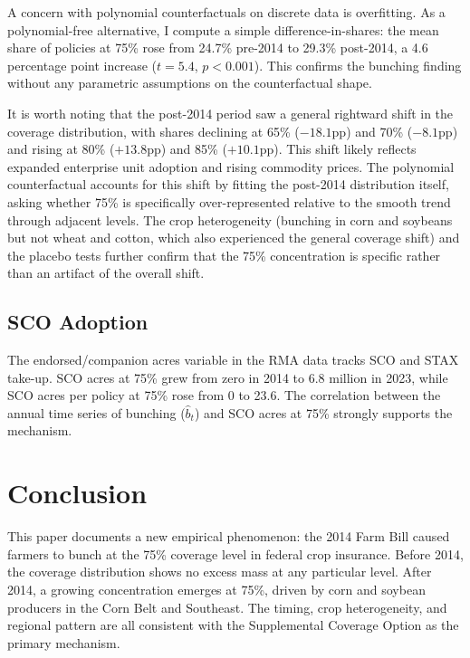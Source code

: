 \documentclass[12pt]{article}
\begin{document}
A concern with polynomial counterfactuals on discrete data is overfitting. As a polynomial-free alternative, I compute a simple difference-in-shares: the mean share of policies at 75\% rose from 24.7\% pre-2014 to 29.3\% post-2014, a 4.6 percentage point increase ($t = 5.4$, $p < 0.001$). This confirms the bunching finding without any parametric assumptions on the counterfactual shape.

It is worth noting that the post-2014 period saw a general rightward shift in the coverage distribution, with shares declining at 65\% ($-18.1$pp) and 70\% ($-8.1$pp) and rising at 80\% ($+13.8$pp) and 85\% ($+10.1$pp). This shift likely reflects expanded enterprise unit adoption and rising commodity prices. The polynomial counterfactual accounts for this shift by fitting the post-2014 distribution itself, asking whether 75\% is specifically over-represented relative to the smooth trend through adjacent levels. The crop heterogeneity (bunching in corn and soybeans but not wheat and cotton, which also experienced the general coverage shift) and the placebo tests further confirm that the 75\% concentration is specific rather than an artifact of the overall shift.

\subsection{SCO Adoption}

The endorsed/companion acres variable in the RMA data tracks SCO and STAX take-up. SCO acres at 75\% grew from zero in 2014 to 6.8 million in 2023, while SCO acres per policy at 75\% rose from 0 to 23.6. The correlation between the annual time series of bunching ($\hat{b}_t$) and SCO acres at 75\% strongly supports the mechanism.


\section{Conclusion}

This paper documents a new empirical phenomenon: the 2014 Farm Bill caused farmers to bunch at the 75\% coverage level in federal crop insurance. Before 2014, the coverage distribution shows no excess mass at any particular level. After 2014, a growing concentration emerges at 75\%, driven by corn and soybean producers in the Corn Belt and Southeast. The timing, crop heterogeneity, and regional pattern are all consistent with the Supplemental Coverage Option as the primary mechanism.
\end{document}
